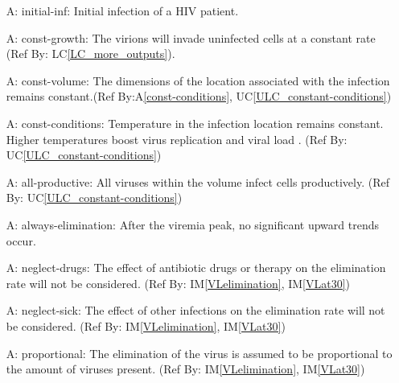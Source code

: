 \documentclass[12pt]{article}
\newcounter{assumpnum} %
\newcommand{\aref}[1]{A\ref{#1}}
\newcommand{\iref}[1]{IM\ref{#1}}
\newcommand{\lcref}[1]{LC\ref{#1}}
\newcommand{\ucref}[1]{UC\ref{#1}}
\begin{document}
  
\begin{itemize}

\item[A\refstepcounter{assumpnum}\theassumpnum \label{initial-inf}:]
initial-inf: Initial infection of a HIV patient.

\item[A\refstepcounter{assumpnum}\theassumpnum \label{const-growth}:]
const-growth: The virions will invade uninfected cells at a constant 
rate (Ref By: \lcref{LC_more_outputs}).
  
\item[A\refstepcounter{assumpnum}\theassumpnum \label{const-volume}:]
const-volume: The dimensions of the location associated with the 
infection remains constant.(Ref By:\aref{const-conditions}, 
\ucref{ULC_constant-conditions})
  
\item[A\refstepcounter{assumpnum}\theassumpnum \label{const-conditions}:]
const-conditions: Temperature in the infection location remains constant. 
Higher temperatures boost virus replication and viral load 
\citep{10.1371/journal.ppat.1002792}. (Ref By:  
\ucref{ULC_constant-conditions})

  
\item[A\refstepcounter{assumpnum}\theassumpnum \label{all-productive}:]
all-productive: All viruses within the volume  infect cells productively. 
(Ref By: 
\ucref{ULC_constant-conditions})
  
\item[A\refstepcounter{assumpnum}\theassumpnum \label{always-elimination}:]
always-elimination: After the viremia peak, no significant upward trends occur.
   
\item[A\refstepcounter{assumpnum}\theassumpnum \label{neglect-drugs}:]
neglect-drugs: The effect of antibiotic drugs or therapy on the elimination rate 
will not be considered. (Ref By: \iref{VLelimination}, \iref{VLat30})
  
\item[A\refstepcounter{assumpnum}\theassumpnum \label{neglect-sick}:]
neglect-sick: The effect of other infections on the elimination rate will not be 
considered. (Ref By: \iref{VLelimination}, \iref{VLat30})

\item[A\refstepcounter{assumpnum}\theassumpnum \label{proportional}:]
proportional: The elimination of the virus is assumed to be proportional to the 
amount of viruses present. (Ref By: \iref{VLelimination}, \iref{VLat30})

\end{itemize}
\end{document}
